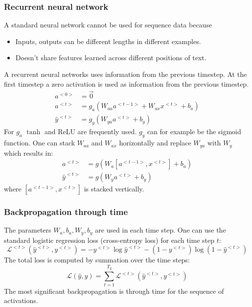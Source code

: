 \documentclass{article}
\begin{document}
\subsubsection{Recurrent neural network}
A standard neural network cannot be used for sequence data because
\begin{itemize}
  \item Inputs, outputs can be different lengths in different examples.
  \item Doesn't share features learned across different positions of text.
\end{itemize}
A recurrent neural networks uses information from the previous timestep.
At the first timestep a zero activation is used as information from the previous timestep.
\begin{equation}
  \begin{split}
    a^{<0>}&=\vec{0}\\
    a^{<t>}&=g_a(W_{aa}a^{<t-1>}+W_{ax}x^{<t>}+b_a)\\
    \hat{y}^{<t>}&=g_y(W_{ya}a^{<t>}+b_y)
  \end{split}
\end{equation}
For $g_a$ $\tanh$ and ReLU are frequently used.
$g_y$ can for example be the sigmoid function.
One can stack $W_{aa}$ and $W_{ax}$ horizontally and replace $W_{ya}$ with $W_y$ which results in:
\begin{equation}
  \begin{split}
    a^{<t>}&=g(W_a[a^{<t-1>},x^{<t>}]+b_a)\\
    \hat{y}^{<t>}&=g(W_ya^{<t>}+b_y)
  \end{split}
\end{equation}
where $[a^{<t-1>},x^{<t>}]$ is stacked vertically.

\subsubsection{Backpropagation through time}
The parameters $W_a, b_a, W_y, b_y$ are used in each time step.
One can use the standard logistic regression loss (cross-entropy loss) for each time step $t$:
\begin{equation}
  \mathcal{L}^{<t>}(\hat{y}^{<t>},y^{<t>})=-y^{<t>}\log\hat{y}^{<t>}-(1-y^{<t>})\log(1-\hat{y}^{<t>})
\end{equation}
The total loss is computed by summation over the time steps:
\begin{equation}
  \mathcal{L}(\hat{y},y)=\sum_{t=1}^{T_y}\mathcal{L}^{<t>}(\hat{y}^{<t>},y^{<t>})
\end{equation}
The most significant backpropagation is through time for the sequence of activations.
\end{document}
